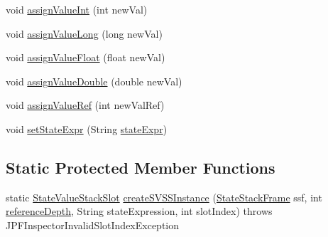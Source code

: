 \begin{DoxyCompactItemize}
\item 
void \hyperlink{classgov_1_1nasa_1_1jpf_1_1inspector_1_1server_1_1programstate_1_1_state_value_stack_slot_a925961b11196a5d1d84b63c892bbb25b}{assign\+Value\+Int} (int new\+Val)
\item 
void \hyperlink{classgov_1_1nasa_1_1jpf_1_1inspector_1_1server_1_1programstate_1_1_state_value_stack_slot_a7830ebf2603d35601f1a54c091fc8285}{assign\+Value\+Long} (long new\+Val)
\item 
void \hyperlink{classgov_1_1nasa_1_1jpf_1_1inspector_1_1server_1_1programstate_1_1_state_value_stack_slot_a91ca6e82de3257ba7b69d3f0da4b6348}{assign\+Value\+Float} (float new\+Val)
\item 
void \hyperlink{classgov_1_1nasa_1_1jpf_1_1inspector_1_1server_1_1programstate_1_1_state_value_stack_slot_a672e21229dff86b87cd17e83d1f9d2a6}{assign\+Value\+Double} (double new\+Val)
\item 
void \hyperlink{classgov_1_1nasa_1_1jpf_1_1inspector_1_1server_1_1programstate_1_1_state_value_stack_slot_ad9d0b571a96053b6b389a2ba83457c25}{assign\+Value\+Ref} (int new\+Val\+Ref)
\item 
void \hyperlink{classgov_1_1nasa_1_1jpf_1_1inspector_1_1server_1_1programstate_1_1_state_node_a7ed75cc4ba543123c95e506db6f7b84c}{set\+State\+Expr} (String \hyperlink{classgov_1_1nasa_1_1jpf_1_1inspector_1_1server_1_1programstate_1_1_state_node_a784a38d8edeb54f871891cb63de85585}{state\+Expr})
\end{DoxyCompactItemize}
\subsection*{Static Protected Member Functions}
\begin{DoxyCompactItemize}
\item 
static \hyperlink{classgov_1_1nasa_1_1jpf_1_1inspector_1_1server_1_1programstate_1_1_state_value_stack_slot}{State\+Value\+Stack\+Slot} \hyperlink{classgov_1_1nasa_1_1jpf_1_1inspector_1_1server_1_1programstate_1_1_state_value_stack_slot_ae891a1e4e2a88dd5566b4dd5e4102cb6}{create\+S\+V\+S\+S\+Instance} (\hyperlink{classgov_1_1nasa_1_1jpf_1_1inspector_1_1server_1_1programstate_1_1_state_stack_frame}{State\+Stack\+Frame} ssf, int \hyperlink{classgov_1_1nasa_1_1jpf_1_1inspector_1_1server_1_1programstate_1_1_state_node_a55683618625dae46e8aa68d95811d6bb}{reference\+Depth}, String state\+Expression, int slot\+Index)  throws J\+P\+F\+Inspector\+Invalid\+Slot\+Index\+Exception 
\end{DoxyCompactItemize}
